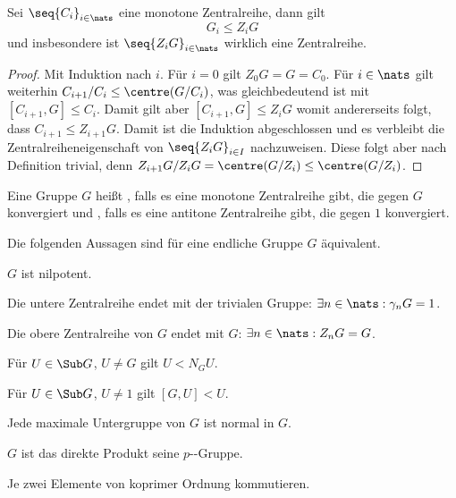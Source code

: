 \begin{lemma}
    Sei $\seq{C_i}_{i\in\nats}$ eine monotone Zentralreihe, dann gilt
    $$
    G_i\leq Z_i G
    $$
    und insbesondere ist $\seq{Z_i G}_{i\in\nats}$ wirklich eine Zentralreihe.
\end{lemma}

\begin{proof}
    Mit Induktion nach $i$. Für $i=0$ gilt $Z_0 G = G = C_0$. Für $i\in\nats$ gilt weiterhin $C_{i+1}/C_i\leq\centre (G/C_i)$, was
    gleichbedeutend ist mit $[C_{i+1},G]\leq C_i$. Damit gilt aber $[C_{i+1},G]\leq Z_i G$ womit andererseits folgt, dass
    $C_{i+1}\leq Z_{i+1} G$. Damit ist die Induktion abgeschlossen und es verbleibt die Zentralreiheneigenschaft von $\seq{Z_i
        G}_{i\in I}$ nachzuweisen. Diese folgt aber nach Definition trivial, denn $Z_{i+1} G/Z_i G=\centre (G/Z_i)\leq\centre(G/Z_i)$.
\end{proof}

\begin{definition}[Nilpotenz]
    Eine Gruppe $G$ heißt , falls es eine monotone Zentralreihe gibt, die gegen $G$ konvergiert und
    , falls es eine antitone Zentralreihe gibt, die gegen $1$ konvergiert. 
\end{definition}

\begin{theorem}
    Die folgenden Aussagen sind für eine endliche Gruppe $G$ äquivalent.
    \begin{statements}
            \item $G$ ist nilpotent.
            \item Die untere Zentralreihe endet mit der trivialen Gruppe: $\exists n\in\nats:\gamma_n G = 1$.
            \item Die obere Zentralreihe von $G$ endet mit $G$: $\exists n\in\nats : Z_n G = G$.
            \item Für $U\in\Sub G$, $U\neq G$ gilt $U<N_G U$.
            \item Für $U\in\Sub G$, $U\neq 1$ gilt $[G,U]<U$.
            \item Jede maximale Untergruppe von $G$ ist normal in $G$.
            \item $G$ ist das direkte Produkt seine $p$--Gruppe.
            \item Je zwei Elemente von koprimer Ordnung kommutieren.
    \end{statements}
\end{theorem}

